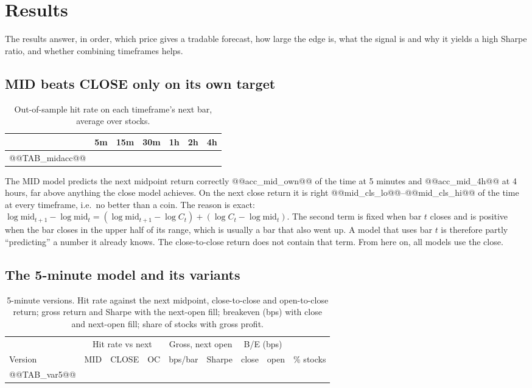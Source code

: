 \documentclass[11pt,a4paper]{article}
\begin{document}
\section{Results}
\label{sec:results}

The results answer, in order, which price gives a tradable forecast, how large the edge is, what the signal is and why it yields a high Sharpe ratio, and whether combining timeframes helps.


\subsection{MID beats CLOSE only on its own target}
\label{sec:mid}

\begin{table}[htbp]
\centering
\caption{Out-of-sample hit rate on each timeframe's next bar, average over stocks.}
\label{tab:midacc}
\small
\begin{tabular}{@{}lrrrrrr@{}}
\toprule
& 5m & 15m & 30m & 1h & 2h & 4h \\
\midrule
@@TAB_midacc@@
\bottomrule
\end{tabular}
\end{table}

The MID model predicts the next midpoint return correctly @@acc_mid_own@@ of the time at 5 minutes and
@@acc_mid_4h@@ at 4 hours, far above anything the close model achieves. On the next close return it is
right @@mid_cls_lo@@--@@mid_cls_hi@@ of the time at every timeframe, i.e.\ no better than a coin. The reason
is exact: $\log\mathrm{mid}_{t+1}-\log\mathrm{mid}_t = (\log\mathrm{mid}_{t+1}-\log C_t) +
(\log C_t-\log\mathrm{mid}_t)$. The second term is fixed when bar $t$ closes and is positive when the bar
closes in the upper half of its range, which is usually a bar that also went up. A model that uses bar
$t$ is therefore partly ``predicting'' a number it already knows. The close-to-close return does not
contain that term. From here on, all models use the close.

\subsection{The 5-minute model and its variants}
\label{sec:close}

\begin{table}[htbp]
\centering
\caption{5-minute versions. Hit rate against the next midpoint, close-to-close and open-to-close
return; gross return and Sharpe with the next-open fill; breakeven (bps) with close and next-open fill;
share of stocks with gross profit.}
\label{tab:var5}
\footnotesize
\setlength{\tabcolsep}{3pt}
\begin{tabular}{@{}lrrrrrrrr@{}}
\toprule
& \multicolumn{3}{c}{Hit rate vs next} & \multicolumn{2}{c}{Gross, next open} & \multicolumn{2}{c}{B/E (bps)} & \\
\cmidrule(lr){2-4}\cmidrule(lr){5-6}\cmidrule(lr){7-8}
Version & MID & CLOSE & OC & bps/bar & Sharpe & close & open & \% stocks \\
\midrule
@@TAB_var5@@
\bottomrule
\end{tabular}
\end{table}
\end{document}
